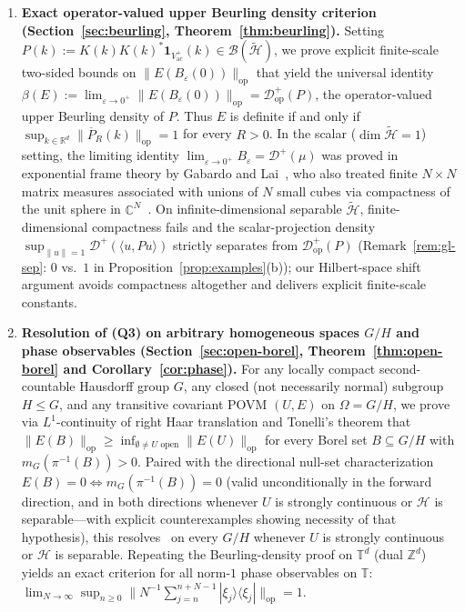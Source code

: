 \documentclass[11pt,a4paper]{article}
\theoremstyle{definition}
\theoremstyle{remark}
\newcommand{\HH}{\mathcal{H}}
\newcommand{\tH}{\widetilde{\mathcal{H}}}
\newcommand{\BB}{\mathcal{B}}
\newcommand{\RR}{\mathbb{R}}
\newcommand{\CC}{\mathbb{C}}
\newcommand{\ZZ}{\mathbb{Z}}
\newcommand{\TT}{\mathbb{T}}
\newcommand{\op}{\mathrm{op}}
\newcommand{\ac}{\mathrm{ac}}
\newcommand{\one}{\mathbf{1}}
\newcommand{\ket}[1]{|#1\rangle}
\newcommand{\bra}[1]{\langle #1|}
\newcommand{\ip}[2]{\langle #1, #2 \rangle}
\newcommand{\norm}[1]{\|#1\|}
\begin{document}
\begin{enumerate}[leftmargin=*,nosep]
\item \textbf{Exact operator-valued upper Beurling density criterion (Section~\ref{sec:beurling}, Theorem~\ref{thm:beurling}).} Setting $P(k):=K(k)K(k)^*\one_{V_\ac^+}(k)\in\BB(\tH)$, we prove explicit finite-scale two-sided bounds on $\norm{E(B_\varepsilon(0))}_{\op}$ that yield the universal identity $\beta(E):=\lim_{\varepsilon\to 0^+}\norm{E(B_\varepsilon(0))}_{\op}=\mathcal{D}_{\op}^+(P)$, the operator-valued upper Beurling density of $P$. Thus $E$ is definite if and only if $\sup_{k\in\RR^d}\norm{\overline{P}_R(k)}_{\op}=1$ for every $R>0$. In the scalar ($\dim\tH=1$) setting, the limiting identity $\lim_{\varepsilon\to 0^+} B_\varepsilon = \mathcal{D}^+(\mu)$ was proved in exponential frame theory by Gabardo and Lai~\cite[Thm.~1, Cor.~3]{GabardoLai2016}, who also treated finite $N\times N$ matrix measures associated with unions of $N$ small cubes via compactness of the unit sphere in $\CC^N$~\cite[Lem.~9, Thms.~14--15]{GabardoLai2016}. On infinite-dimensional separable $\tH$, finite-dimensional compactness fails and the scalar-projection density $\sup_{\norm{u}=1}\mathcal{D}^+(\ip{u}{Pu})$ strictly separates from $\mathcal{D}_{\op}^+(P)$ (Remark~\ref{rem:gl-sep}: $0$ vs.\ $1$ in Proposition~\ref{prop:examples}(b)); our Hilbert-space shift argument avoids compactness altogether and delivers explicit finite-scale constants.
\item \textbf{Resolution of (Q3) on arbitrary homogeneous spaces $G/H$ and phase observables (Section~\ref{sec:open-borel}, Theorem~\ref{thm:open-borel} and Corollary~\ref{cor:phase}).} For any locally compact second-countable Hausdorff group $G$, any closed (not necessarily normal) subgroup $H\le G$, and any transitive covariant POVM $(U,E)$ on $\Omega=G/H$, we prove via $L^1$-continuity of right Haar translation and Tonelli's theorem that $\norm{E(B)}_{\op}\ge \inf_{\emptyset\neq U\text{ open}}\norm{E(U)}_{\op}$ for every Borel set $B\subseteq G/H$ with $m_G(\pi^{-1}(B))>0$. Paired with the directional null-set characterization $E(B)=0\iff m_G(\pi^{-1}(B))=0$ (valid unconditionally in the forward direction, and in both directions whenever $U$ is strongly continuous or $\HH$ is separable---with explicit counterexamples showing necessity of that hypothesis), this resolves~\cite[Sec.~5.1]{Heinonen2003} on every $G/H$ whenever $U$ is strongly continuous or $\HH$ is separable. Repeating the Beurling-density proof on $\TT^d$ (dual $\ZZ^d$) yields an exact criterion for all norm-$1$ phase observables on $\TT$: $\lim_{N\to\infty}\sup_{n\ge 0}\norm{N^{-1}\sum_{j=n}^{n+N-1}\ket{\xi_j}\bra{\xi_j}}_{\op}=1$.

\end{enumerate}
\end{document}
